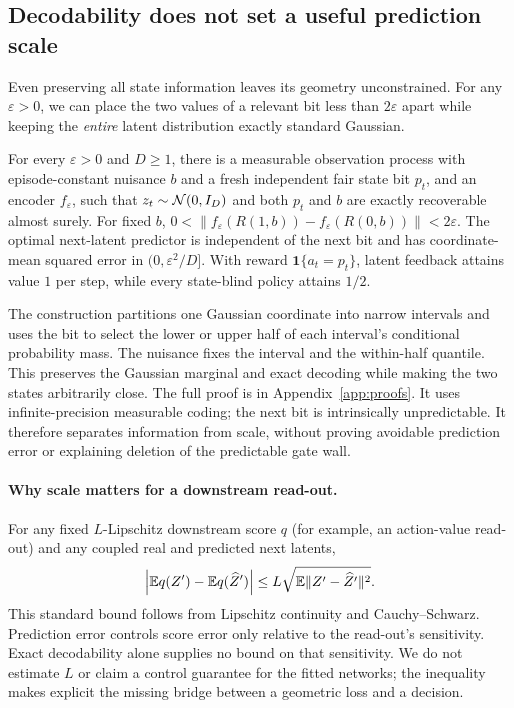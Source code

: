\subsection{Decodability does not set a useful prediction scale}
\label{sec:amplitude}

Even preserving all state information leaves its geometry unconstrained. For any $\varepsilon>0$,
we can place the two values of a relevant bit less than $2\varepsilon$ apart while keeping the
\emph{entire} latent distribution exactly standard Gaussian.

\begin{proposition}
\label{prop:amplitude}
For every $\varepsilon>0$ and $D\ge1$, there is a measurable observation process with episode-constant
nuisance $b$ and a fresh independent fair state bit $p_t$, and an encoder $f_\varepsilon$, such that
$z_t\sim\mathcal{N}(0,I_D)$ and both $p_t$ and $b$ are exactly recoverable almost surely. For fixed $b$,
$0<\|f_\varepsilon(R(1,b))-f_\varepsilon(R(0,b))\|<2\varepsilon$.
The optimal next-latent predictor is independent of the next bit and has coordinate-mean squared
error in $(0,\varepsilon^2/D]$. With reward $\mathbf1\{a_t=p_t\}$, latent feedback attains value $1$
per step, while every state-blind policy attains $1/2$.
\end{proposition}

The construction partitions one Gaussian coordinate into narrow intervals and uses the bit to
select the lower or upper half of each interval's conditional probability mass. The nuisance fixes
the interval and the within-half quantile. This preserves the Gaussian marginal and exact decoding
while making the two states arbitrarily close. The full proof is in Appendix~\ref{app:proofs}.
It uses infinite-precision measurable coding; the next bit is intrinsically unpredictable. It therefore
separates information from scale, without proving avoidable prediction error or explaining deletion
of the predictable gate wall.

\paragraph{Why scale matters for a downstream read-out.}
For any fixed $L$-Lipschitz downstream score $q$ (for example, an action-value read-out)
and any coupled real and predicted next latents,
\begin{equation}
\label{eq:readout}
\left|\mathbb{E} q(Z')-\mathbb{E} q(\widehat Z')\right|
\le L\sqrt{\mathbb{E}\|Z'-\widehat Z'\|^2}.
\end{equation}
This standard bound follows from Lipschitz continuity and Cauchy--Schwarz. Prediction error controls
score error only relative to the read-out's sensitivity. Exact decodability alone supplies no bound
on that sensitivity. We do not estimate $L$ or claim a control guarantee for the fitted networks;
the inequality makes explicit the missing bridge between a geometric loss and a decision.
